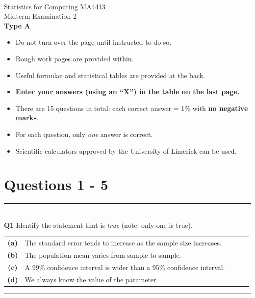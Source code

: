 \documentclass[12pt]{article}
\begin{document}
\quad\\[2cm]

\begin{center}
{\Huge Statistics for Computing MA4413\\[0.8cm]
Midterm Examination 2\\[1cm]
{\bf Type A}}\\[2cm]
\end{center}

\begin{itemize}\itemsep0.6cm
\item Do not turn over the page until instructed to do so.
\item Rough work pages are provided within.
\item Useful formulae and statistical tables are provided at the back.
\item {\bf Enter your answers (using an ``X'') in the table on the last page.}
\item There are 15 questions in total: each correct answer = 1\% with {\bf no negative marks}.
\item For each question, only \emph{one} answer is correct.
\item Scientific calculators approved by the University of Limerick can be used.
\end{itemize}
\newpage
\section*{Questions 1 - 5}


\rule{\linewidth}{1pt}
\quad\\
{\bf Q1} Identify the statement that is \emph{true} (note: only one is true).\\[0.2cm]
\begin{tabular}{c@{\,\,\,}llll}
{\bf(a)} & The standard error tends to increase as the sample size increases.\\[0.2cm]
{\bf(b)} & The population mean varies from sample to sample. \\[0.2cm]
{\bf(c)} & A 99\% confidence interval is wider than a 95\% confidence interval. \\[0.2cm]
{\bf(d)} & We always know the value of the parameter. \\[0.6cm]
\end{tabular}



\rule{\linewidth}{1pt}
\quad
\end{document}
